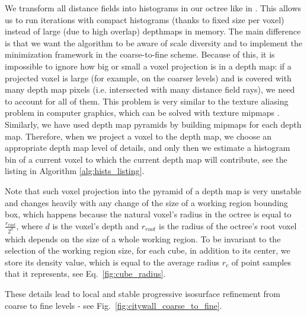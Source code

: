 \documentclass[10pt,twocolumn,letterpaper]{article}
\begin{document}
We transform all distance fields into histograms in our octree like in \cite{zach2007globally}. This allows us
to run iterations with compact histograms \cite{zach2008fast} (thanks to fixed size per voxel) instead of large (due to high overlap) depthmaps \cite{zach2007globally} in memory.
The main difference is that we want the algorithm to be aware of scale diversity and to implement the minimization framework in the coarse-to-fine scheme. Because of this, it is impossible to ignore how big or small a voxel projection is in a depth map: if a projected voxel is large (for example, on the coarser levels) and is covered with many depth map pixels (i.e. intersected with many distance field rays), we need to account for all of them. This problem is very similar to the texture aliasing problem in computer graphics, which can be solved
with texture mipmaps \cite{williams1983pyramidal}. Similarly, we have used depth map pyramids by building mipmaps for each depth map. Therefore, when we
project a voxel to the depth map, we choose an appropriate depth map level of details, and only then we estimate a histogram bin of a current voxel to which the current depth map will contribute,
see the listing in Algorithm \ref{alg:hists_listing}.

Note that such voxel projection into the pyramid of a depth map is very unstable and changes heavily with any change of the size of a working region bounding box, which happens because the natural voxel's radius in the octree is equal to $\frac{r_{root}}{2^{d}}$, where $d$ is the voxel's depth and $r_{root}$ is
the radius of the octree's root voxel which depends on the size of a whole working region. To be invariant to the selection of the working region size,
for each cube, in addition to its center, we store its density value, which is equal to the average radius $r_c$ of point samples that it represents, see Eq.~\ref{fig:cube_radius}.

These details lead to local and stable progressive isosurface refinement from coarse to fine levels - see Fig.~\ref{fig:citywall_coarse_to_fine}.
\end{document}
